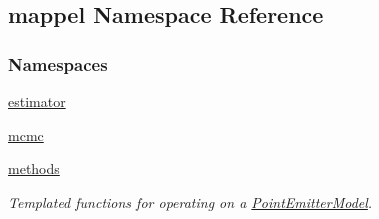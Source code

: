 \hypertarget{namespacemappel}{}\subsection{mappel Namespace Reference}
\label{namespacemappel}
\subsubsection*{Namespaces}
\begin{DoxyCompactItemize}
\item 
 \hyperlink{namespacemappel_1_1estimator}{estimator}
\item 
 \hyperlink{namespacemappel_1_1mcmc}{mcmc}
\item 
 \hyperlink{namespacemappel_1_1methods}{methods}
\begin{DoxyCompactList}\small\item\em Templated functions for operating on a \hyperlink{classmappel_1_1PointEmitterModel}{Point\+Emitter\+Model}. \end{DoxyCompactList}\end{DoxyCompactItemize}
